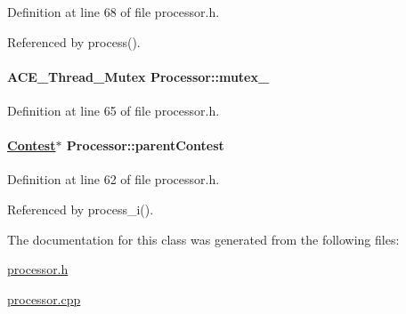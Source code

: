 Definition at line 68 of file processor.h.

Referenced by process().\hypertarget{classProcessor_Processoro1}{
\paragraph[mutex\_\-]{\setlength{\rightskip}{0pt plus 5cm}ACE\_\-Thread\_\-Mutex Processor::mutex\_\-}\hfill}
\label{classProcessor_Processoro1}




Definition at line 65 of file processor.h.\hypertarget{classProcessor_Processoro0}{
\paragraph[parentContest]{\setlength{\rightskip}{0pt plus 5cm}\hyperlink{classContest}{Contest}$\ast$ Processor::parent\-Contest}\hfill}
\label{classProcessor_Processoro0}




Definition at line 62 of file processor.h.

Referenced by process\_\-i().

The documentation for this class was generated from the following files:\begin{CompactItemize}
\item 
\hyperlink{processor_8h}{processor.h}\item 
\hyperlink{processor_8cpp}{processor.cpp}\end{CompactItemize}
